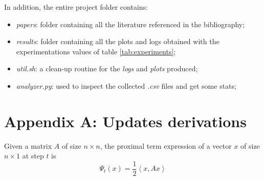 \documentclass[notitlepage]{article}
\begin{document}
In addition, the entire project folder contains:
\begin{itemize}
  \item \textit{papers}: folder containing all the literature referenced in the bibliography;
  \item \textit{results}: folder containing all the plots and logs obtained with the experimentations values of table \ref{tab:experiments};
  \item \textit{util.sh}: a clean-up routine for the \textit{logs} and \textit{plots} produced;
  \item \textit{analyzer.py}: used to inspect the collected \textit{.csv} files and get some stats;
\end{itemize}


\newpage




\newpage

\appendix

\section{Appendix A: Updates derivations}
\label{sec:appendix}
Given a matrix $A$ of size $n \times n$, the proximal term expression of a vector $x$ of size $n\times 1$ at step $t$ is
\[
  \Psi_t(x) = \frac{1}{2} \left\langle x, A x \right\rangle  
\]
\end{document}
